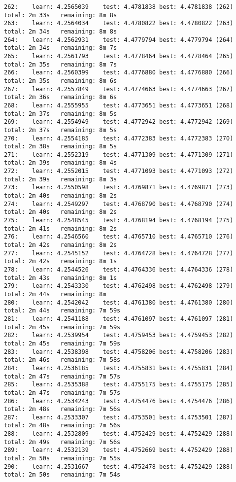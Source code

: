 \documentclass[11pt]{article}
\begin{document}
\begin{Verbatim}[commandchars=\\\{\}]
262:	learn: 4.2565039	test: 4.4781838	best: 4.4781838 (262)	total: 2m 33s	remaining: 8m 8s
263:	learn: 4.2564034	test: 4.4780822	best: 4.4780822 (263)	total: 2m 34s	remaining: 8m 8s
264:	learn: 4.2562931	test: 4.4779794	best: 4.4779794 (264)	total: 2m 34s	remaining: 8m 7s
265:	learn: 4.2561793	test: 4.4778464	best: 4.4778464 (265)	total: 2m 35s	remaining: 8m 7s
266:	learn: 4.2560399	test: 4.4776880	best: 4.4776880 (266)	total: 2m 35s	remaining: 8m 6s
267:	learn: 4.2557849	test: 4.4774663	best: 4.4774663 (267)	total: 2m 36s	remaining: 8m 6s
268:	learn: 4.2555955	test: 4.4773651	best: 4.4773651 (268)	total: 2m 37s	remaining: 8m 5s
269:	learn: 4.2554949	test: 4.4772942	best: 4.4772942 (269)	total: 2m 37s	remaining: 8m 5s
270:	learn: 4.2554185	test: 4.4772383	best: 4.4772383 (270)	total: 2m 38s	remaining: 8m 5s
271:	learn: 4.2552319	test: 4.4771309	best: 4.4771309 (271)	total: 2m 39s	remaining: 8m 4s
272:	learn: 4.2552015	test: 4.4771093	best: 4.4771093 (272)	total: 2m 39s	remaining: 8m 3s
273:	learn: 4.2550598	test: 4.4769871	best: 4.4769871 (273)	total: 2m 40s	remaining: 8m 2s
274:	learn: 4.2549297	test: 4.4768790	best: 4.4768790 (274)	total: 2m 40s	remaining: 8m 2s
275:	learn: 4.2548545	test: 4.4768194	best: 4.4768194 (275)	total: 2m 41s	remaining: 8m 2s
276:	learn: 4.2546560	test: 4.4765710	best: 4.4765710 (276)	total: 2m 42s	remaining: 8m 2s
277:	learn: 4.2545152	test: 4.4764728	best: 4.4764728 (277)	total: 2m 42s	remaining: 8m 1s
278:	learn: 4.2544526	test: 4.4764336	best: 4.4764336 (278)	total: 2m 43s	remaining: 8m 1s
279:	learn: 4.2543330	test: 4.4762498	best: 4.4762498 (279)	total: 2m 44s	remaining: 8m
280:	learn: 4.2542042	test: 4.4761380	best: 4.4761380 (280)	total: 2m 44s	remaining: 7m 59s
281:	learn: 4.2541188	test: 4.4761097	best: 4.4761097 (281)	total: 2m 45s	remaining: 7m 59s
282:	learn: 4.2539954	test: 4.4759453	best: 4.4759453 (282)	total: 2m 45s	remaining: 7m 59s
283:	learn: 4.2538398	test: 4.4758206	best: 4.4758206 (283)	total: 2m 46s	remaining: 7m 58s
284:	learn: 4.2536185	test: 4.4755831	best: 4.4755831 (284)	total: 2m 47s	remaining: 7m 57s
285:	learn: 4.2535388	test: 4.4755175	best: 4.4755175 (285)	total: 2m 47s	remaining: 7m 57s
286:	learn: 4.2534243	test: 4.4754476	best: 4.4754476 (286)	total: 2m 48s	remaining: 7m 56s
287:	learn: 4.2533307	test: 4.4753501	best: 4.4753501 (287)	total: 2m 48s	remaining: 7m 56s
288:	learn: 4.2532809	test: 4.4752429	best: 4.4752429 (288)	total: 2m 49s	remaining: 7m 56s
289:	learn: 4.2532139	test: 4.4752669	best: 4.4752429 (288)	total: 2m 50s	remaining: 7m 55s
290:	learn: 4.2531667	test: 4.4752478	best: 4.4752429 (288)	total: 2m 50s	remaining: 7m 54s

\end{Verbatim}
\end{document}
